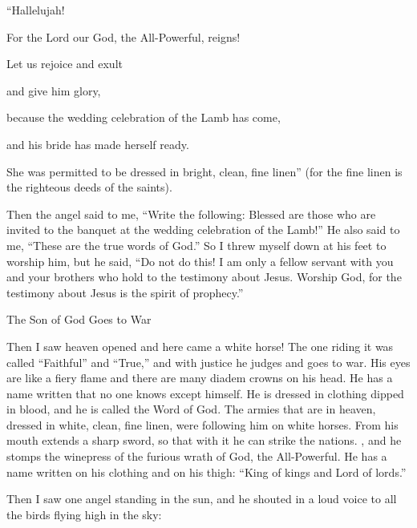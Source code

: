 {\par }{\Q “Hallelujah!
\par }{\Q For
the Lord
our
God,
the All-Powerful,
reigns!
\par }{\Q {}Let us rejoice
and
exult
\par }{\Q and
give
him
glory,
\par }{\Q because
the wedding celebration
of the Lamb
has come,
\par }{\Q and
his
bride
has made
herself
ready.
\par }{\Q {}She was permitted
to
be dressed in
bright,
clean,
fine linen”
(for
the fine linen
is
the righteous deeds
of the saints).
\par }{\PP {}Then
the angel said
to me,
“Write
the following: Blessed
are those who are invited
to
the banquet
at the wedding celebration
of the Lamb!” He
also
said
to me,
“These
are
the true
words
of God.”
So
I threw
myself down
at his
feet
to worship
him,
but
he said,
“Do
not
do
this! I am
only a fellow servant
with you
and
your
brothers
who hold
to the testimony
about Jesus.
Worship
God,
for
the testimony
about Jesus
is
the
spirit
of prophecy.”
\par }{\SH The Son of God Goes to War
\par }{\PP {}Then
I saw
heaven
opened
and
here came
a white
horse! The one riding
it
was called
“Faithful”
and
“True,”
and
with
justice
he judges
and
goes to war.
His
eyes
are like a fiery
flame
and
there are many
diadem crowns
on
his
head.
He has
a name
written
that
no one
knows
except
himself.
He
is dressed in
clothing
dipped
in blood,
and
he is called
the Word
of God.
The armies
that are in
heaven,
dressed in
white,
clean,
fine linen,
were following
him
on
white
horses.
From
his
mouth
extends
a sharp
sword,
so that
with
it
he can strike
the nations.
{},
and
he
stomps
the winepress
of the
furious
wrath
of God,
the All-Powerful.
He
has
a name
written
on
his clothing
and
on
his
thigh: “King
of kings
and
Lord
of lords.”
\par }{\PP {}Then
I saw
one
angel
standing
in
the sun,
and
he shouted
in
a loud
voice
to all
the birds
flying
high in the sky:

}
